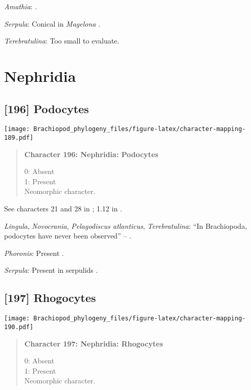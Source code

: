 \documentclass[openany]{book}
\theoremstyle{definition}
\theoremstyle{definition}
\theoremstyle{definition}
\theoremstyle{remark}
\begin{document}
\hypertarget{Amathia-coding-195}{}
\emph{Amathia}: \citet{Reed1982}.

\hypertarget{Serpula-coding-195}{}
\emph{Serpula}: Conical in \emph{Magelona} \citep{Bartolomaeus1995}.

\hypertarget{Terebratulina-coding-195}{}
\emph{Terebratulina}: Too small to evaluate.

\section{Nephridia}\label{nephridia}

\subsection*{{[}196{]} Podocytes}\label{podocytes}

\texttt{[image: Brachiopod\_phylogeny\_files/figure-latex/character-mapping-189.pdf]}

\begin{quote}
\textbf{Character 196: Nephridia: Podocytes}

0: Absent\\
1: Present\\
Neomorphic character.
\end{quote}

See characters 21 and 28 in \citet{Haszprunar2000}; 1.12 in
\citet{Scheltema1993}.

\hypertarget{Lingula-coding-196}{}
\emph{Lingula}, \emph{Novocrania}, \emph{Pelagodiscus atlanticus},
\emph{Terebratulina}: ``In Brachiopoda, podocytes have never been
observed'' -- \citet{Luter1995}.

\hypertarget{Phoronis-coding-196}{}
\emph{Phoronis}: Present \citep{Storch1978}.

\hypertarget{Serpula-coding-196}{}
\emph{Serpula}: Present in serpulids \citep{Bartolomaeus2005}.

\subsection*{{[}197{]} Rhogocytes}\label{rhogocytes}

\texttt{[image: Brachiopod\_phylogeny\_files/figure-latex/character-mapping-190.pdf]}

\begin{quote}
\textbf{Character 197: Nephridia: Rhogocytes}

0: Absent\\
1: Present\\
Neomorphic character.
\end{quote}
\end{document}
